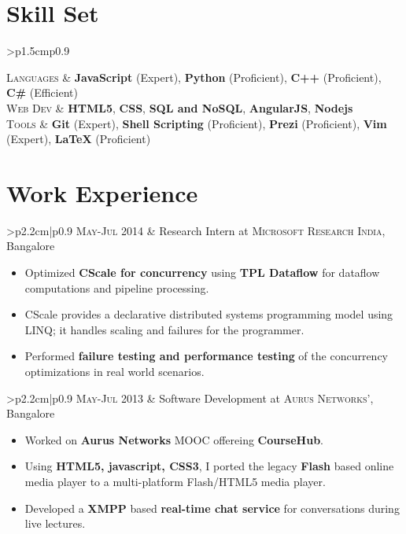 \documentclass[a4paper,10pt]{article} %
\newcommand{\work}[3]{
    \begin{tabular}{>{\raggedleft}p{2.2cm}|p{0.9\linewidth}}
        \textsc{#1} & \textcolor{NavyBlue}{#2}
                    \footnotesize{#3}
    \end{tabular}
}
\newcommand{\itemlist}[1]{
    \begin{tabular}{>{\raggedleft}p{1.5cm}p{0.9\linewidth}}
        #1
    \end{tabular}
}
\begin{document}
\section{Skill Set}

\itemlist {
    \textsc{Languages} %
            & \textbf{JavaScript} (Expert), \textbf{Python} (Proficient), \textbf{C++}
              (Proficient), \textbf{C\#} (Efficient)\\
    \textsc{Web Dev} %
            & \textbf{HTML5}, \textbf{CSS}, \textbf{SQL and NoSQL}, \textbf{AngularJS}, \textbf{Nodejs}\\
    \textsc{Tools} %
            & \textbf{Git} (Expert), \textbf{Shell Scripting} (Proficient),
              \textbf{Prezi} (Proficient), \textbf{Vim} (Expert), \textbf{LaTeX}
              (Proficient)\\
}


\section{Work Experience}

\work {May-Jul 2014}
      {Research Intern at \textsc{Microsoft Research India}, Bangalore}
      {
         \begin{itemize}[leftmargin=*]
             \item Optimized \textbf{CScale for concurrency} using \textbf{TPL Dataflow}
                 for dataflow computations and pipeline processing.
             \item CScale provides a declarative distributed systems programming
                 model using LINQ; it handles scaling and failures for the programmer.
             \item Performed \textbf{failure testing and performance testing}
                 of the concurrency optimizations in real world scenarios.
         \end{itemize}
     }

\work {May-Jul 2013}
      {Software Development at \textsc{Aurus Networks'}, Bangalore}
      {
          \begin{itemize}[leftmargin=*]
              \item Worked on \textbf{Aurus Networks} MOOC offereing \textbf{CourseHub}.
              \item Using \textbf{HTML5, javascript, CSS3}, I ported the legacy
                  \textbf{Flash} based online media player to a multi-platform
                  Flash/HTML5 media player.
              \item Developed a \textbf{XMPP} based \textbf{real-time chat service} for
                  conversations during live lectures.
          \end{itemize}
      }
\end{document}
